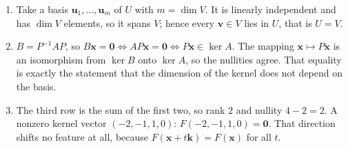 \begin{enumerate}[label=\textbf{7.\arabic*}]
  \item Take a basis $\mathbf{u}_{1},\dots,\mathbf{u}_{m}$ of $U$ with
        $m=\dim V$. It is linearly independent and has $\dim V$ elements, so it spans
        $V$; hence every $\mathbf{v}\in V$ lies in $U$, that is $U=V$.

  \item $B=P^{-1}AP$, so $B\mathbf{x}=\mathbf{0}\iff AP\mathbf{x}=\mathbf{0}
        \iff P\mathbf{x}\in\ker A$. The mapping $\mathbf{x}\mapsto P\mathbf{x}$ is
        an isomorphism from $\ker B$ onto $\ker A$, so the nullities agree. That
        equality is exactly the statement that the dimension of the kernel does not
        depend on the basis.

  \item The third row is the sum of the first two, so rank $2$ and nullity
        $4-2=2$. A nonzero kernel vector $(-2,-1,1,0)$: $F(-2,-1,1,0)=\mathbf{0}$.
        That direction shifts no feature at all, because
        $F(\mathbf{x}+t\mathbf{k})=F(\mathbf{x})$ for all $t$.
\end{enumerate}

